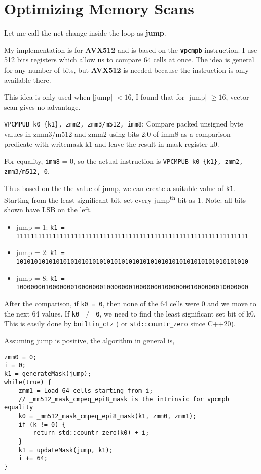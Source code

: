 \documentclass[11pt,answers]{exam}
\begin{document}
\pagebreak
\section{Optimizing Memory Scans}
Let me call the net change inside the loop as \textbf{jump}.

My implementation is for \textbf{AVX512} and is based on the \textbf{\texttt{vpcmpb}} instruction. I use 512 bits registers which allow us to compare 64 cells at once. The idea is general for any number of bits, but \textbf{AVX512} is needed because the instruction is only available there.

This idea is only used when $\mid$jump$\mid$ $< 16$, I found that for $\mid$jump$\mid$ $\ge16$, vector scan gives no advantage.

\bigskip
\texttt{VPCMPUB k0 \{k1\}, zmm2, zmm3/m512, imm8}: Compare packed unsigned byte values in zmm3/m512 and zmm2 using bits 2:0 of imm8 as a comparison predicate with writemask k1 and leave the result in mask register k0.


For equality, \texttt{imm8} = 0, so the actual instruction is \texttt{VPCMPUB k0 \{k1\}, zmm2, zmm3/m512, 0}.

\bigskip
Thus based on the the value of jump, we can create a suitable value of \texttt{k1}. Starting from the least significant bit, set every jump\textsuperscript{th} bit as 1. Note: all bits shown have LSB on the left.
\begin{itemize}
	\item jump = 1: \texttt{k1 = 1111111111111111111111111111111111111111111111111111111111111111}
	\item jump = 2: \texttt{k1 = 1010101010101010101010101010101010101010101010101010101010101010}
	\item jump = 8: \texttt{k1 = 1000000010000000100000001000000010000000100000001000000010000000}
\end{itemize}

\bigskip
After the comparison, if \texttt{k0 = 0}, then none of the 64 cells were 0 and we move to the next 64 values. If \texttt{k0 $\ne$ 0}, we need to find the least significant set bit of k0. This is easily done by \texttt{builtin\_ctz} ( or \texttt{std::countr\_zero} since C++20).

Assuming jump is positive, the algorithm in general is,
\begin{verbatim}
zmm0 = 0;
i = 0;
k1 = generateMask(jump);
while(true) {
    zmm1 = Load 64 cells starting from i;
    // _mm512_mask_cmpeq_epi8_mask is the intrinsic for vpcmpb equality
    k0 = _mm512_mask_cmpeq_epi8_mask(k1, zmm0, zmm1); 
    if (k != 0) {
        return std::countr_zero(k0) + i;
    }
    k1 = updateMask(jump, k1);
    i += 64;
}
\end{verbatim}
\end{document}
